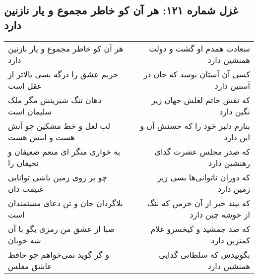 \begin{center}
\section*{غزل شماره ۱۲۱: هر آن کو خاطر مجموع و یار نازنین دارد}
\label{sec:sh121}
\begin{longtable}{l p{0.5cm} r}
هر آن کو خاطر مجموع و یار نازنین دارد
&&
سعادت همدم او گشت و دولت همنشین دارد
\\
حریم عشق را درگه بسی بالاتر از عقل است
&&
کسی آن آستان بوسد که جان در آستین دارد
\\
دهان تنگ شیرینش مگر ملک سلیمان است
&&
که نقش خاتم لعلش جهان زیر نگین دارد
\\
لب لعل و خط مشکین چو آنش هست و اینش هست
&&
بنازم دلبر خود را که حسنش آن و این دارد
\\
به خواری منگر ای منعم ضعیفان و نحیفان را
&&
که صدر مجلس عشرت گدای رهنشین دارد
\\
چو بر روی زمین باشی توانایی غنیمت دان
&&
که دوران ناتوانی‌ها بسی زیر زمین دارد
\\
بلاگردان جان و تن دعای مستمندان است
&&
که بیند خیر از آن خرمن که ننگ از خوشه چین دارد
\\
صبا از عشق من رمزی بگو با آن شه خوبان
&&
که صد جمشید و کیخسرو غلام کمترین دارد
\\
و گر گوید نمی‌خواهم چو حافظ عاشق مفلس
&&
بگوییدش که سلطانی گدایی همنشین دارد
\\
\end{longtable}
\end{center}
